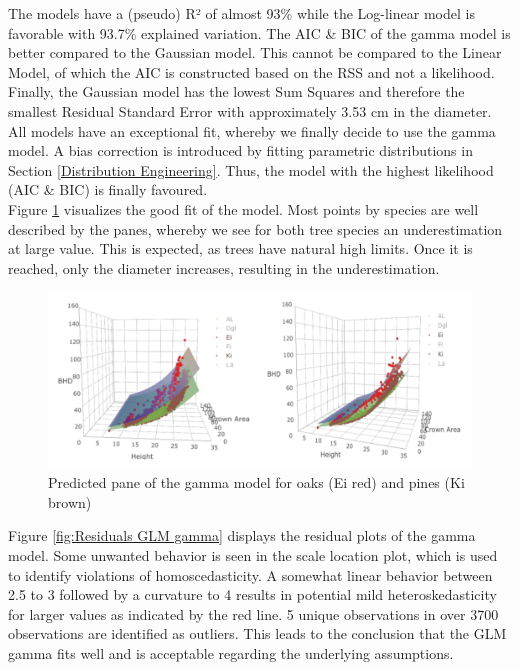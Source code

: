 The models have a (pseudo) R² of almost 93\% while the Log-linear model is favorable with 93.7\% explained variation. The AIC \& BIC of the gamma model is better compared to the Gaussian model. This cannot be compared to the Linear Model, of which the AIC is constructed based on the RSS and not a likelihood. Finally, the Gaussian model has the lowest Sum Squares and therefore the smallest Residual Standard Error with approximately 3.53 cm in the diameter.\\

All models have an exceptional fit, whereby we finally decide to use the gamma model. A bias correction
is introduced by fitting parametric distributions in Section \ref{Distribution Engineering}. Thus, the model with the highest likelihood (AIC \& BIC) is finally favoured.\\

Figure \ref{fig:Pane} visualizes the good fit of the model. Most points by species are well described by the panes, whereby
we see for both tree species an underestimation at large value. This is expected, as trees have natural high
limits. Once it is reached, only the diameter increases, resulting in the underestimation. \\

\begin{figure}[H]
  \includegraphics[width=\textwidth]{predicted_pane.png}
  \caption{Predicted pane of the gamma model for oaks (Ei red) and pines (Ki brown)}
  \label{fig:Pane}
\end{figure}

Figure \ref{fig:Residuals GLM gamma} displays the residual plots of the gamma model. Some unwanted behavior is seen in the scale location
plot, which is used to identify violations of homoscedasticity. A somewhat linear behavior between 2.5 to 3
followed by a curvature to 4 results in potential mild heteroskedasticity for larger values as indicated by the red
line. 5 unique observations in over 3700 observations
are identified as outliers. This leads to the conclusion that the GLM gamma fits well and is acceptable regarding
the underlying assumptions.

